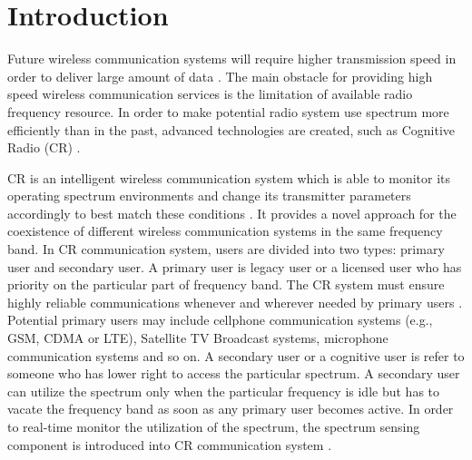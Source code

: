 \chapter{Introduction}
Future wireless communication systems will require higher transmission speed in order to deliver large amount of data \cite{pelcat20133gpp}. The main obstacle for providing high speed wireless communication services is the limitation of available radio frequency resource. In order to make potential radio system use spectrum more efficiently than in the past, advanced technologies are created, such as Cognitive Radio (CR) \cite{nonotice}. 

CR is an intelligent wireless communication system which is able to monitor its operating spectrum environments and change its transmitter parameters accordingly to best match these conditions \cite{wang2011advances, a001}. It provides a novel approach for the coexistence of different wireless communication systems in the same frequency band. In CR communication system, users are divided into two types: primary user and secondary user. A primary user is legacy user or a licensed user who has priority on the particular part of frequency band. The CR system must ensure highly reliable communications whenever and wherever needed by primary users \cite{a001}. Potential primary users may include cellphone communication systems (e.g., GSM, CDMA or LTE), Satellite TV Broadcast systems, microphone communication systems and so on. A secondary user or a cognitive user is refer to someone who has lower right to access the particular spectrum. A secondary user can utilize the spectrum only when the particular frequency is idle but has to vacate the frequency band as soon as any primary user becomes active. 
In order to real-time monitor the utilization of the spectrum, the spectrum sensing component is introduced into CR communication system \cite{buddhikot2007understanding, tandra2009spectrum}.   

